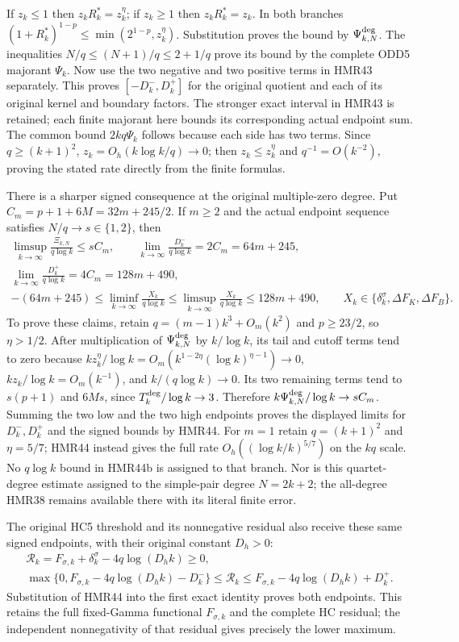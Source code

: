 If $z_k\leq1$ then $z_kR_k^*=z_k^\eta$; if $z_k\geq1$
then $z_kR_k^*=z_k$. In both branches
$(1+R_k^*)^{1-p}\leq\min(2^{1-p},z_k^\eta)$.
Substitution proves the bound by $\Psi_{k,N}^{\rm deg}$.
The inequalities $N/q\leq(N+1)/q\leq2+1/q$ prove its
bound by the complete ODD5 majorant $\Psi_k$.
Now use the two negative and two positive terms in HMR43
separately. This proves $[-D_k^-,D_k^+]$ for the original
quotient and each of its original kernel and boundary factors.
The stronger exact interval in HMR43 is retained; each finite
majorant here bounds its corresponding actual endpoint sum.
The common bound $2kq\Psi_k$ follows because each side has
two terms. Since $q\geq(k+1)^2$, $z_k=O_h(k\log k/q)\to0$;
then $z_k\leq z_k^\eta$ and $q^{-1}=O(k^{-2})$, proving
the stated rate directly from the finite formulas.

There is a sharper signed consequence at the original
multiple-zero degree. Put
$C_m=p+1+6M=32m+245/2$. If $m\geq2$ and the actual
endpoint sequence satisfies $N/q\to s\in\{1,2\}$, then
\[
\begin{gathered}
 \limsup_{k\to\infty}\frac{\Xi_{k,N}}{q\log k}
       \leq sC_m,\qquad
 \lim_{k\to\infty}\frac{D_k^-}{q\log k}=2C_m=64m+245,\\
 \lim_{k\to\infty}\frac{D_k^+}{q\log k}=4C_m=128m+490,\\
 -(64m+245)\leq\liminf_{k\to\infty}\frac{X_k}{q\log k}
 \leq\limsup_{k\to\infty}\frac{X_k}{q\log k}
 \leq128m+490,\qquad
 X_k\in\{\delta_k^\sigma,\Delta F_K,\Delta F_B\}.
\end{gathered}\tag{HMR44b}
\]
To prove these claims, retain $q=(m-1)k^3+O_m(k^2)$ and
$p\geq23/2$, so $\eta>1/2$.
After multiplication of $\Psi_{k,N}^{\rm deg}$ by
$k/\log k$, its tail and cutoff terms tend to zero because
$kz_k^\eta/\log k
=O_m(k^{1-2\eta}(\log k)^{\eta-1})\to0$,
$kz_k/\log k=O_m(k^{-1})$, and
$k/(q\log k)\to0$. Its two remaining terms tend to
$s(p+1)$ and $6Ms$, since $T_k^{\rm deg}/\log k\to3$.
Therefore $k\Psi_{k,N}^{\rm deg}/\log k\to sC_m$.
Summing the two low and the two high endpoints proves
the displayed limits for $D_k^-,D_k^+$ and the signed
bounds by HMR44. For $m=1$ retain $q=(k+1)^2$ and
$\eta=5/7$; HMR44 instead gives the full rate
$O_h((\log k/k)^{5/7})$ on the $kq$ scale.
No $q\log k$ bound in HMR44b is assigned to that branch.
Nor is this quartet-degree estimate assigned to the
simple-pair degree $N=2k+2$; the all-degree HMR38 remains
available there with its literal finite error.

The original HC5 threshold and its nonnegative residual
also receive these same signed endpoints, with their
original constant $D_h>0$:
\[
\begin{gathered}
 \mathcal R_k=F_{\sigma,k}+\delta_k^\sigma
                         -4q\log(D_hk)\geq0,\\
 \max\{0,F_{\sigma,k}-4q\log(D_hk)-D_k^-\}
 \leq\mathcal R_k
 \leq F_{\sigma,k}-4q\log(D_hk)+D_k^+.
\end{gathered}\tag{HMR44c}
\]
Substitution of HMR44 into the first exact identity proves
both endpoints. This retains the full fixed-Gamma functional
$F_{\sigma,k}$ and the complete HC residual; the independent
nonnegativity of that residual gives precisely the lower maximum.


